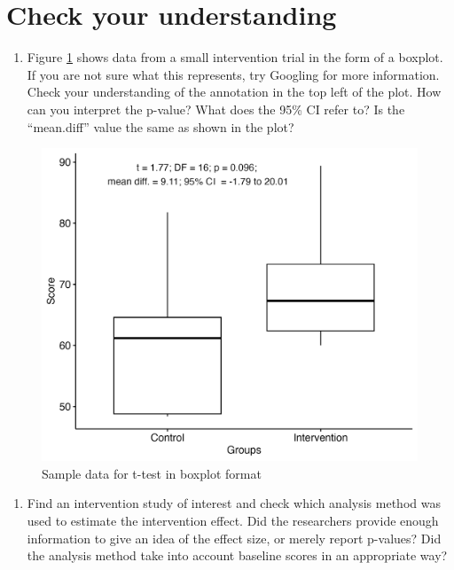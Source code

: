 \documentclass{krantz}
\providecommand{\tightlist}{%
\setlength{\itemsep}{0pt}\setlength{\parskip}{0pt}}
\begin{document}
\hypertarget{check-your-understanding-11}{%
\section{Check your understanding}\label{check-your-understanding-11}}

\begin{enumerate}
\def\labelenumi{\arabic{enumi}.}
\tightlist
\item
  Figure \ref{fig:boxploteg} shows data from a small intervention trial in the form of a boxplot. If you are not sure what this represents, try Googling for more information. Check your understanding of the annotation in the top left of the plot. How can you interpret the p-value? What does the 95\% CI refer to? Is the ``mean.diff'' value the same as shown in the plot?
\end{enumerate}

\begin{figure}
\includegraphics[width=0.8\linewidth]{images_bw/boxeg} \caption{Sample data for t-test in boxplot format}\label{fig:boxploteg}
\end{figure}



\begin{enumerate}
\def\labelenumi{\arabic{enumi}.}
\setcounter{enumi}{1}
\tightlist
\item
  Find an intervention study of interest and check which analysis method was used to estimate the intervention effect. Did the researchers provide enough information to give an idea of the effect size, or merely report p-values? Did the analysis method take into account baseline scores in an appropriate way?
\end{enumerate}
\end{document}
